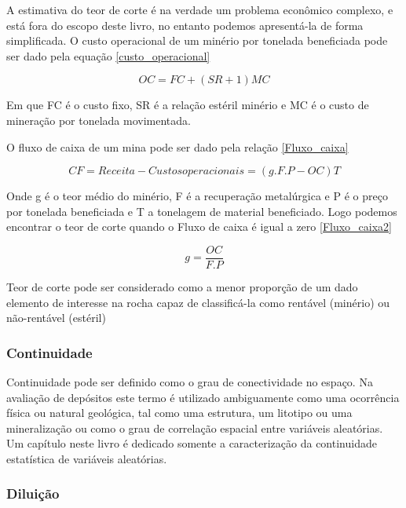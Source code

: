 A estimativa do teor de corte é na verdade um problema econômico complexo, e está fora do escopo deste livro, no entanto podemos apresentá-la de forma simplificada. O custo operacional de um minério por tonelada beneficiada pode ser dado pela equação \eqref{custo_operacional}

\begin{equation}\label{custo_operacional}
OC = FC + (SR +1 )MC
\end{equation}

Em que FC é o custo fixo, SR é a relação estéril minério e MC é o custo de mineração por tonelada movimentada. 

O fluxo de caixa de um mina pode ser dado pela relação \eqref{Fluxo_caixa}

\begin{equation}\label{Fluxo_caixa}
CF = Receita - Custos operacionais = (g.F.P-OC)T
\end{equation}

Onde g é o teor médio do minério, F é a recuperação metalúrgica e P é o preço por tonelada beneficiada e T a tonelagem de material beneficiado. Logo podemos encontrar o teor de corte quando o Fluxo de caixa é igual a zero \eqref{Fluxo_caixa2} 

\begin{equation}\label{Fluxo_caixa2}
g = \frac{OC}{F.P}
\end{equation} 

\begin{remark}
	Teor de corte pode ser considerado como a menor proporção de um dado elemento de interesse na rocha capaz de classificá-la como rentável (minério) ou não-rentável (estéril)
\end{remark}

\subsubsection{Continuidade}

Continuidade pode ser definido como o grau de conectividade no espaço. Na avaliação de depósitos este termo é utilizado ambiguamente como uma ocorrência física ou natural geológica, tal como uma estrutura, um litotipo ou uma mineralização ou como o grau de correlação espacial entre variáveis aleatórias. Um capítulo neste livro é dedicado somente a caracterização da continuidade estatística de variáveis aleatórias.

\subsubsection{Diluição}

